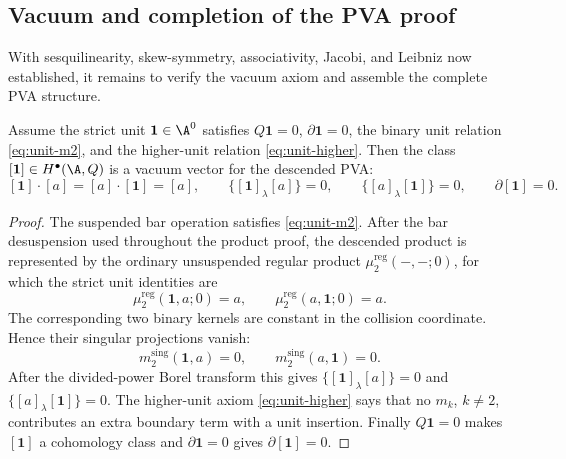 \subsection{Vacuum and completion of the PVA proof}

With sesquilinearity, skew-symmetry, associativity, Jacobi, and
Leibniz now established, it remains to verify the vacuum axiom
and assemble the complete PVA structure.

\begin{proposition}
\label{prop:PVA4_proof}
Assume the strict unit \(\mathbf 1\in\A^0\) satisfies
\(Q\mathbf 1=0\), \(\partial\mathbf 1=0\), the binary unit relation
\eqref{eq:unit-m2}, and the higher-unit relation
\eqref{eq:unit-higher}.  Then the class
$[\mathbf 1]\in H^\bullet(\A,Q)$ is a vacuum vector for the descended
PVA:
\[
[\mathbf 1]\cdot[a]=[a]\cdot[\mathbf 1]=[a],
\qquad
\{[\mathbf 1]_\lambda[a]\}=0,
\qquad
\{[a]_\lambda[\mathbf 1]\}=0,
\qquad
\partial[\mathbf 1]=0.
\]
\end{proposition}

\begin{proof}
The suspended bar operation satisfies \eqref{eq:unit-m2}.  After the
bar desuspension used throughout the product proof, the descended
product is represented by the ordinary unsuspended regular product
\(\mu_2^{\mathrm{reg}}(-,-;0)\), for which the strict unit identities
are
\[
\mu_2^{\mathrm{reg}}(\mathbf 1,a;0)=a,\qquad
\mu_2^{\mathrm{reg}}(a,\mathbf 1;0)=a .
\]
The corresponding two binary kernels are constant in the collision
coordinate.  Hence their singular projections vanish:
\[
m_2^{\mathrm{sing}}(\mathbf 1,a)=0,
\qquad
m_2^{\mathrm{sing}}(a,\mathbf 1)=0.
\]
After the divided-power Borel transform this gives
\(\{[\mathbf 1]_\lambda[a]\}=0\) and
\(\{[a]_\lambda[\mathbf 1]\}=0\).  The higher-unit axiom
\eqref{eq:unit-higher} says that no \(m_k\), \(k\ne2\), contributes an
extra boundary term with a unit insertion.  Finally
\(Q\mathbf 1=0\) makes \([\mathbf 1]\) a cohomology class and
\(\partial\mathbf 1=0\) gives \(\partial[\mathbf 1]=0\).
\end{proof}

